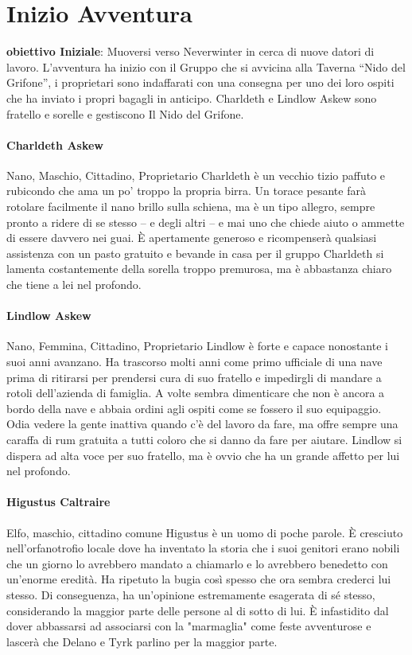 \documentclass{article}
\begin{document}
\section{Inizio Avventura}

\textbf{obiettivo Iniziale}: Muoversi verso Neverwinter in cerca di nuove datori di lavoro.
L’avventura ha inizio con il Gruppo che si avvicina alla Taverna “Nido del Grifone”, i proprietari sono indaffarati con una consegna per uno dei loro ospiti che ha inviato i propri bagagli in anticipo.
Charldeth e Lindlow Askew sono fratello e sorelle e gestiscono Il Nido del Grifone. 
\paragraph{Charldeth Askew}
Nano, Maschio, Cittadino, Proprietario
Charldeth è un vecchio tizio paffuto e rubicondo che ama un po' troppo la propria birra. Un torace pesante farà rotolare facilmente il nano brillo sulla schiena, ma è un tipo allegro, sempre pronto a ridere di se stesso – e degli altri – e mai uno che chiede aiuto o ammette di essere davvero nei guai. È apertamente generoso e ricompenserà qualsiasi assistenza con un pasto gratuito e bevande in casa per il gruppo
Charldeth si lamenta costantemente della sorella troppo premurosa, ma è abbastanza chiaro che tiene a lei nel profondo.

\paragraph{Lindlow Askew }
Nano, Femmina, Cittadino, Proprietario
Lindlow è forte e capace nonostante i suoi anni avanzano. Ha trascorso molti anni come primo ufficiale di una nave prima di ritirarsi per prendersi cura di suo fratello e impedirgli di mandare a rotoli dell'azienda di famiglia.
A volte sembra dimenticare che non è ancora a bordo della nave e abbaia ordini agli ospiti come se fossero il suo equipaggio. Odia vedere la gente inattiva quando c'è del lavoro da fare, ma offre sempre una caraffa di rum gratuita a tutti coloro che si danno da fare per aiutare.
Lindlow si dispera ad alta voce per suo fratello, ma è ovvio che ha un grande affetto per lui nel profondo.
\paragraph{Higustus Caltraire} Elfo, maschio, cittadino comune
Higustus è un uomo di poche parole. È cresciuto nell'orfanotrofio locale dove ha inventato la storia che i suoi genitori erano nobili che un giorno lo avrebbero mandato a chiamarlo e lo avrebbero benedetto con un'enorme eredità. Ha ripetuto la bugia così spesso che ora sembra crederci lui stesso. Di conseguenza, ha un'opinione estremamente esagerata di sé stesso, considerando la maggior parte delle persone al di sotto di lui.
È infastidito dal dover abbassarsi ad associarsi con la "marmaglia" come feste avventurose e lascerà che Delano e Tyrk parlino per la maggior parte.
\end{document}

